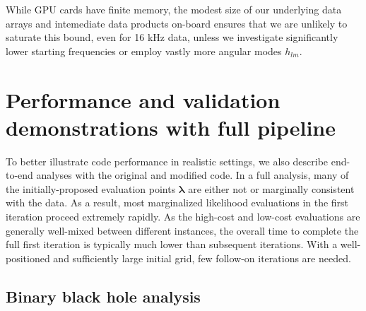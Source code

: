 \documentclass[twocolumn,prd,nofootinbib]{revtex4}
\newcommand\editremark[1]{{\color{red} #1}}
\begin{document}
While GPU cards have finite memory, the modest size of our underlying data arrays and intemediate data products on-board ensures that we are unlikely to
saturate this bound, even for 16 kHz data, unless we investigate significantly lower starting frequencies or
employ vastly more angular modes $h_{lm}$.

\section{Performance and validation demonstrations with full pipeline}
\label{sec:end-to-end}

To better illustrate code performance in realistic settings, we also describe end-to-end analyses with
the original and modified code.     In a full analysis, many of the initially-proposed  evaluation points $\bm{\lambda}$ are
either not or marginally consistent with the data.  As a result, most marginalized likelihood evaluations in the first
iteration proceed extremely rapidly.  As the high-cost and low-cost evaluations are generally well-mixed between
different instances, the overall time to complete the full first iteration is typically much lower than subsequent
iterations.   With a well-positioned and sufficiently large initial grid,  few follow-on iterations are needed.  




\subsection{Binary black hole analysis}
\label{sec:sub:BBHFull}
\end{document}
